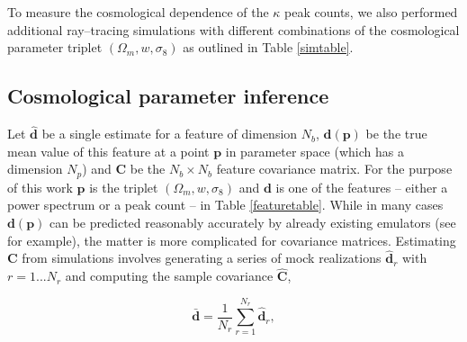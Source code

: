 \documentclass[reprint,aps,prd,superscriptaddress,showkeys,showpacs]{revtex4-1}
\newcommand{\bb}[1]{\mathbf{#1}}
\newcommand{\bbh}[1]{\mathbf{\hat{#1}}}
\begin{document}

To measure the cosmological dependence of the $\kappa$ peak counts, we also performed additional ray--tracing simulations with different combinations of the cosmological parameter triplet $(\Omega_m,w,\sigma_8)$ as outlined in Table \ref{simtable}.

\subsection{Cosmological parameter inference}
%

Let $\bbh{d}$ be a single estimate for a feature of dimension $N_b$, 
$\bb{d}(\bb{p})$ be the
true mean value of this feature at a point $\bb{p}$ in parameter space
(which has a dimension $N_p$) and $\bb{C}$ be the $N_b\times N_b$
feature covariance matrix. For the purpose of this work $\bb{p}$ is
the triplet $(\Omega_m,w,\sigma_8)$ and $\bb{d}$ is one of the
features -- either a power spectrum or a peak count -- in Table
\ref{featuretable}. While in many cases $\bb{d}(\bb{p})$ can be
predicted reasonably accurately by already existing emulators (see
\citep{coyote2,Nicaea} for example), the matter is more complicated
for covariance matrices.
Estimating $\bb{C}$ from simulations involves generating a series of
mock realizations $\bbh{d}_r$ with $r=1...N_r$ and computing the
sample covariance $\bbh{C}$,

\begin{equation}
\bb{\bar{d}} = \frac{1}{N_r}\sum_{r=1}^{N_r} \bbh{d}_r,
\end{equation}
\end{document}

